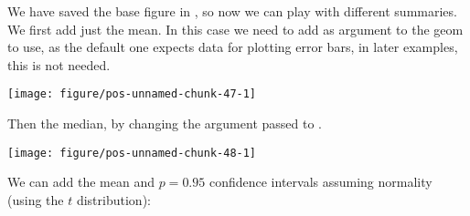 \documentclass[paper=a4,headsepline,BCOR=12mm,twoside,open=right,%
titlepage,headings=small,fontsize=10pt,index=totoc,bibliography=totoc,%
captions=tableheading,captions=nooneline]{scrbook}\usepackage{knitr}
\begin{document}
We have saved the base figure in , so now we can play with different summaries. We first add just the mean. In this case we need to add as argument to  the geom to use, as the default one expects data for plotting error bars, in later examples, this is not needed.

\begin{knitrout}\footnotesize
{}\color{fgcolor}\begin{kframe}
\begin{alltt}
 \hlopt{+} \hlstd{(} \hlstd{=} \hlstd{,} \hlstd{=}\hlstd{,}
                    \hlstd{=}\hlstd{,} \hlstd{=}\hlstd{,} \hlstd{=}\hlstd{)}
\end{alltt}
\end{kframe}

{\centering \texttt{[image: figure/pos-unnamed-chunk-47-1]} 

}



\end{knitrout}

Then the median, by changing the argument passed to .

\begin{knitrout}\footnotesize
{}\color{fgcolor}\begin{kframe}
\begin{alltt}
 \hlopt{+} \hlstd{(} \hlstd{=} \hlstd{,} \hlstd{=}\hlstd{,}
                    \hlstd{=}\hlstd{,} \hlstd{=}\hlstd{,} \hlstd{=}\hlstd{)}
\end{alltt}
\end{kframe}

{\centering \texttt{[image: figure/pos-unnamed-chunk-48-1]} 

}



\end{knitrout}

We can add the mean and $p = 0.95$ confidence intervals assuming normality (using the $t$ distribution):
\end{document}
